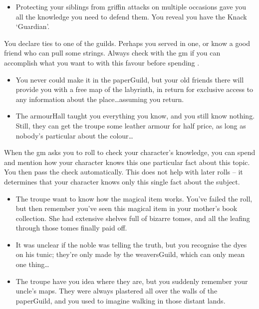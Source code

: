 \begin{multicols}{2}
\begin{itemize}
\item Protecting your siblings from griffin attacks on multiple occasions gave you all the knowledge you need to defend them.
You reveal you have the Knack `Guardian'.
\end{itemize}

You declare ties to one of the guilds.
Perhaps you served in one, or know a good friend who can pull some strings.
Always check with the \gls{gm} if you can accomplish what you want to with this favour before spending .

\begin{itemize}
  \item
  You never could make it in the \gls{paperGuild}, but your old friends there will provide you with a free map of the labyrinth, in return for exclusive access to any information about the place\ldots assuming you return.
  \item
  The \gls{armourHall} taught you everything you know, and you still know nothing.
  Still, they can get the troupe some leather armour for half price, as long as nobody's particular about the colour\ldots
\end{itemize}

When the \gls{gm} asks you to roll to check your character's knowledge, you can spend  and mention how your character knows this one particular fact about this topic.
You then pass the check automatically.
This does not help with later rolls -- it determines that your character knows only this single fact about the subject.

\begin{itemize}
  \item
  The troupe want to know how the magical item works.
  You've failed the roll, but then remember you've seen this magical item in your mother's book collection.
  She had extensive shelves full of bizarre tomes, and all the leafing through those tomes finally paid off.
  \item
  It was unclear if the noble was telling the truth, but you recognise the dyes on his tunic; they're only made by the \gls{weaversGuild}, which can only mean one thing\ldots
  \item
  The troupe have you idea where they are, but you suddenly remember your uncle's maps.
  They were always plastered all over the walls of the \gls{paperGuild}, and you used to imagine walking in those distant lands.
\end{itemize}


\end{multicols}
